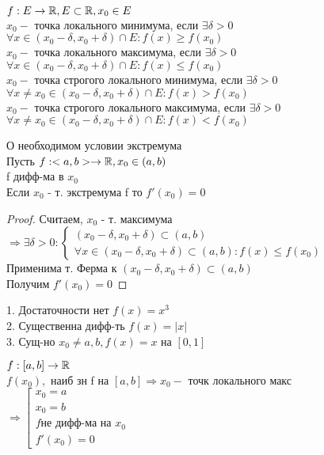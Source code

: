 $ f : E \rightarrow \mathbb{R}, E \subset \mathbb{R}, x_0 \in E  $\\
$ x_0 - $ точка локального минимума, если $ \exists \delta > 0 $ \\
$ \forall x \in (x_0 - \delta, x_0 + \delta) \cap E : f(x) \geq f(x_0) $ \\
$ x_0 - $ точка локального максимума, если $ \exists \delta > 0 $ \\
$ \forall x \in (x_0 - \delta, x_0 + \delta) \cap E : f(x) \leq f(x_0) $ \\
$ x_0 - $ точка строгого локального минимума, если $ \exists \delta > 0 $ \\
$ \forall x \neq x_0 \in (x_0 - \delta, x_0 + \delta) \cap E : f(x) > f(x_0) $ \\
$ x_0 - $ точка строгого локального максимума, если $ \exists \delta > 0 $ \\
$ \forall x \neq x_0 \in (x_0 - \delta, x_0 + \delta) \cap E : f(x) < f(x_0) $ \\
\begin{theorem}
	О необходимом условии экстремума \\
	Пусть $ f : <a,b> \rightarrow \mathbb{R}, x_0 \in (a, b) $ \\
	f дифф-ма в $x_0$\\
	Если $ x_0 $ - т. экстремума f то $ f'(x_0) = 0 $ \\
	\begin{proof}
		Считаем, $ x_0 $ - т. максимума \\
		$ \Rightarrow \exists \delta > 0 : \left\{ \begin{array}{c} ( x_0 - \delta, x_0 + \delta) \subset (a, b) \\ \forall x \in ( x_0 - \delta, x_0 + \delta) \subset (a, b) : f(x) \leq f(x_0) \end{array} \right.$ \\
		Применима т. Ферма к $( x_0 - \delta, x_0 + \delta) \subset (a, b)$ \\
		Получим $ f'(x_0) = 0 $
	\end{proof}
	1. Достаточности нет $ f(x) = x^3 $ \\
	2. Существенна дифф-ть $ f(x) = |x| $ \\
	3. Сущ-но $ x_0 \neq a, b, f(x) = x $ на $ [0, 1] $
\end{theorem}
$ f : [a, b] \rightarrow \mathbb{R} $ \\
$ f(x_0), $ наиб зн f на $ [a,b] \Rightarrow x_0 - $ точк локального макс  \\
$\Rightarrow \left[ \begin{array}{cc}
x_0 = a \\
x_0 = b \\
f \text{не дифф-ма на } x_0 \\
f'(x_0) = 0 
\end{array}  \right.$ 
